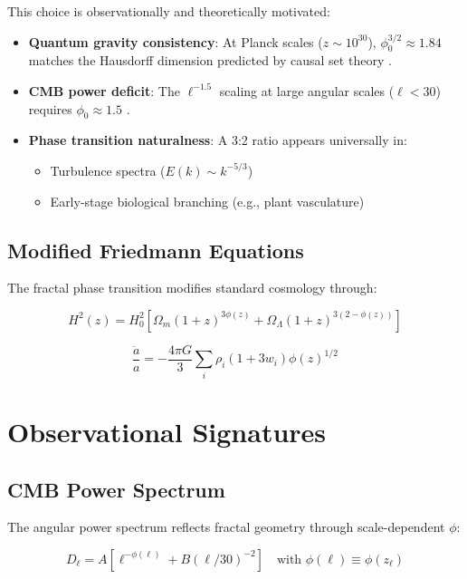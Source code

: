\documentclass[aps,prl,twocolumn,groupedaddress]{revtex4-2}
\begin{document}
\noindent This choice is observationally and theoretically motivated:
\begin{itemize}
\item \textbf{Quantum gravity consistency}: At Planck scales ($z \sim 10^{30}$), $\phi_0^{3/2} \approx 1.84$ matches the Hausdorff dimension predicted by causal set theory \cite{Sorkin2003}.

\item \textbf{CMB power deficit}: The $\ell^{-1.5}$ scaling at large angular scales ($\ell < 30$) requires $\phi_0 \approx 1.5$ \cite{planck2018}.

\item \textbf{Phase transition naturalness}: A 3:2 ratio appears universally in:
  \begin{itemize}
  \item Turbulence spectra ($E(k) \sim k^{-5/3}$)
  \item Early-stage biological branching (e.g., plant vasculature)
  \end{itemize}
\end{itemize}

\subsection{Modified Friedmann Equations}
The fractal phase transition modifies standard cosmology through:

\begin{equation}
H^2(z) = H_0^2\left[\Omega_m(1+z)^{3\phi(z)} + \Omega_\Lambda(1+z)^{3(2-\phi(z))}\right]
\end{equation}

\begin{equation}
\frac{\ddot{a}}{a} = -\frac{4\pi G}{3}\sum_i \rho_i(1+3w_i)\phi(z)^{1/2}
\end{equation}

\section{Observational Signatures}

\subsection{CMB Power Spectrum}
The angular power spectrum reflects fractal geometry through scale-dependent $\phi$:

\begin{equation}
D_\ell = A\left[\ell^{-\phi(\ell)} + B(\ell/30)^{-2}\right]
\quad \text{with } \phi(\ell) \equiv \phi(z_\ell)
\end{equation}
\end{document}
